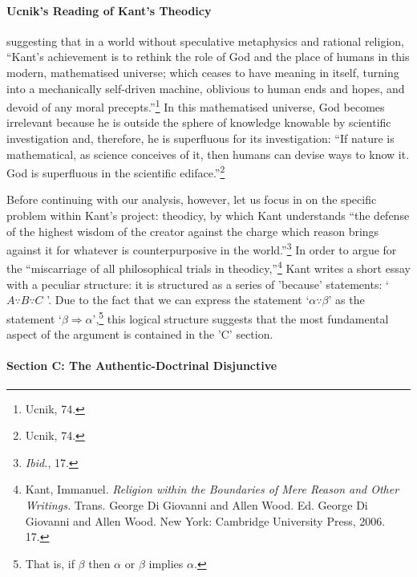 \documentclass[12pt]{article}
\begin{document}
	\paragraph*{Ucnik's Reading of Kant's Theodicy}  















 suggesting that in a world without speculative metaphysics and rational religion, ``Kant's achievement is to rethink the role of God and the place of humans in this modern, mathematised universe; which ceases to have meaning in itself, turning into a mechanically self-driven machine, oblivious to human ends and  hopes, and devoid of any moral precepts.''\footnote{Ucnik, 74.} In this mathematised universe, God becomes irrelevant because he is outside the sphere of knowledge knowable by scientific investigation and, therefore, he is superfluous for its investigation: ``If nature is mathematical, as science conceives of it, then humans can devise ways to know it. God is superfluous in the scientific ediface.''\footnote{Ucnik, 74.}


  





Before continuing with our analysis, however, let us focus in on the specific problem within Kant's project: theodicy, by which Kant understands ``the defense of the highest wisdom of the creator against the charge which reason brings against it for whatever is counterpurposive in the world.''\footnote{\emph{Ibid.}, 17.} In order to argue for the ``miscarriage of all philosophical trials in theodicy,''\footnote{Kant, Immanuel. \emph{Religion within the Boundaries of Mere Reason and Other Writings.} Trans. George Di Giovanni and Allen Wood. Ed. George Di Giovanni and Allen Wood. New York: Cambridge University Press, 2006. 17.} Kant writes a short essay with a peculiar structure: it is structured as a series of 'because' statements: `$ A \because   B\because C$ '. Due to the fact that we can express the statement `$ \alpha \because \beta $'  as the statement `$\beta \Rightarrow \alpha $',\footnote{That is, if $\beta$ then $\alpha$ or $\beta$ implies $\alpha$.} this logical structure suggests that the most fundamental aspect of the argument is contained in the 'C' section. 

\paragraph*{Section C: The Authentic-Doctrinal Disjunctive}
\end{document}
